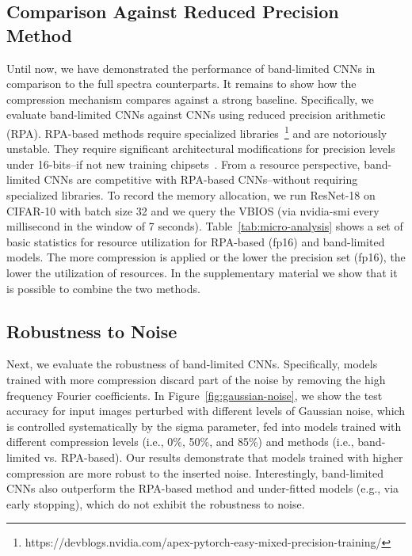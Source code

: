 \subsection{Comparison Against Reduced Precision Method}
Until now, we have demonstrated the performance of band-limited CNNs in comparison to the full spectra counterparts. It remains to show how the compression mechanism compares against a strong baseline. Specifically, we evaluate band-limited CNNs against CNNs using reduced precision arithmetic (RPA). RPA-based methods require specialized libraries~\footnote{https://devblogs.nvidia.com/apex-pytorch-easy-mixed-precision-training/} and are notoriously unstable. They require significant architectural modifications for precision levels under 16-bits--if not new training chipsets~\cite{wang2018training, abergerhigh}.
From a resource perspective, band-limited CNNs are competitive with RPA-based CNNs--without requiring specialized libraries. To record the memory allocation, we run ResNet-18 on CIFAR-10 with batch size 32 and we query the VBIOS (via nvidia-smi
every millisecond in the window of 7 seconds). Table~\ref{tab:micro-analysis} shows a set of basic statistics for resource utilization for RPA-based (fp16) and band-limited models. The more compression is applied or the lower the precision set (fp16), the lower the utilization of resources. %
In the supplementary material we show that it is possible to combine the two methods.

\subsection{Robustness to Noise}

Next, we evaluate the robustness of band-limited CNNs. Specifically, models trained with more compression discard part of the noise by removing the high frequency Fourier coefficients. In Figure~\ref{fig:gaussian-noise}, we show the test accuracy for input images perturbed with different levels of Gaussian noise, which is controlled systematically by the sigma parameter, fed into models trained with different compression levels (i.e., 0\%, 50\%, and 85\%) and methods (i.e., band-limited vs. RPA-based). Our results demonstrate that models trained with higher compression are more robust to the inserted noise. Interestingly, band-limited CNNs also outperform the RPA-based method and under-fitted models (e.g., via early stopping), which do not exhibit the robustness to noise.

